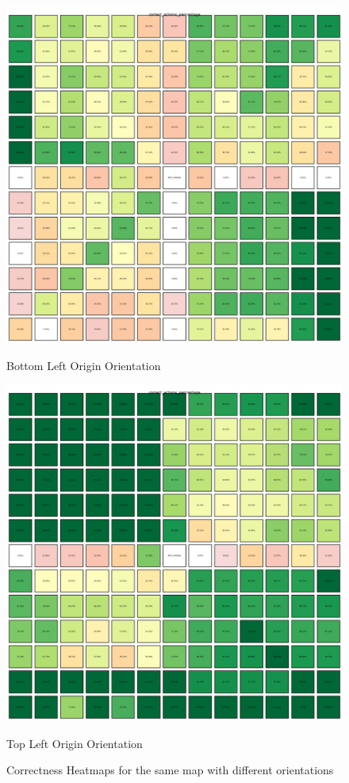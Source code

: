 \begin{figure}[h]
  \centering
  \begin{minipage}[b]{0.45\textwidth}
    \centering
    \includegraphics[width=\textwidth]{
      images/results_discussion/correctness_hm_BL.png
    }
    \caption{Bottom Left Origin Orientation}
    \label{fig:heatmapBL}
  \end{minipage}
  \hfill
  \begin{minipage}[b]{0.45\textwidth}
    \centering
    \includegraphics[width=\textwidth]{
      images/results_discussion/correctness_hm_TL.png
    }
    \caption{Top Left Origin Orientation}
    \label{fig:heatmapTL}
  \end{minipage}
  \caption{Correctness Heatmaps for the same map with different orientations}
  \label{fig:orientation_correctness}
\end{figure}
